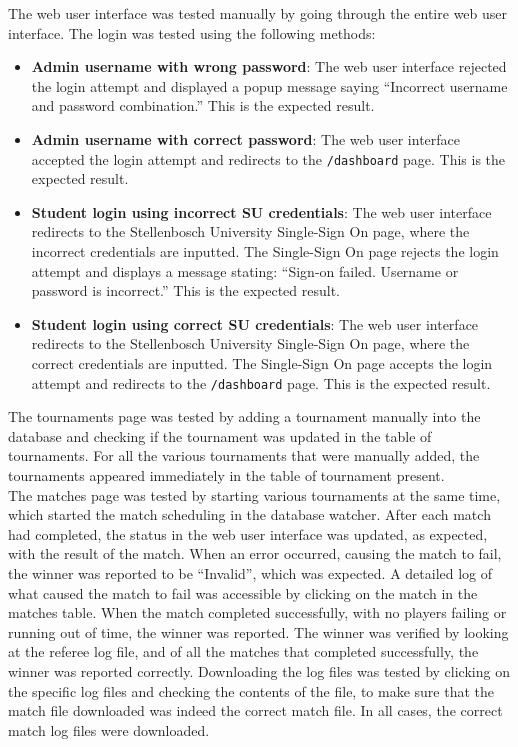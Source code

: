 \documentclass[a4paper, 11pt]{report}
\begin{document}
The web user interface was tested manually by going through the entire web user
interface. The login was tested using the following methods:
\begin{itemize}
	\item \textbf{Admin username with wrong password}: The web user interface
	rejected the login attempt and displayed a popup message saying ``Incorrect
	username and password combination.'' This is the expected result.
	\item \textbf{Admin username with correct password}: The web user interface
	accepted the login attempt and redirects to the \texttt{/dashboard} page.
	This is the expected result.
	\item \textbf{Student login using incorrect SU credentials}: The web user
	interface redirects to the Stellenbosch University Single-Sign On page,
	where the incorrect credentials are inputted. The Single-Sign On page rejects
	the login attempt and displays a message stating: ``Sign-on failed. Username
	or password is incorrect.'' This is the expected result.
	\item \textbf{Student login using correct SU credentials}: The web user
	interface redirects to the Stellenbosch University Single-Sign On page,
	where the correct credentials are inputted. The Single-Sign On page accepts
	the login attempt and redirects to the \texttt{/dashboard} page. This is the
	expected result.
\end{itemize}
The tournaments page was tested by adding a tournament manually into the database
and checking if the tournament was updated in the table of tournaments. For all
the various tournaments that were manually added, the tournaments appeared
immediately in the table of tournament present. \\

The matches page was tested by starting various tournaments at the same time,
which started the match scheduling in the database watcher. After each match
had completed, the status in the web user interface was updated, as expected,
with the result of the match. When an error occurred, causing the match to
fail, the winner was reported to be ``Invalid'', which was expected. A detailed
log of what caused the match to fail was accessible by clicking on the match
in the matches table. When the match completed successfully, with no players
failing or running out of time, the winner was reported. The winner was verified
by looking at the referee log file, and of all the matches that completed
successfully, the winner was reported correctly. Downloading the log files was
tested by clicking on the specific log files and checking the contents of the
file, to make sure that the match file downloaded was indeed the correct match
file. In all cases, the correct match log files were downloaded. \\
\end{document}
